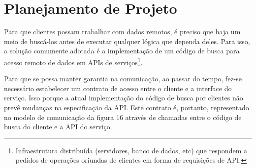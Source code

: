 \section{Planejamento de Projeto}

Para que clientes possam trabalhar com dados remotos, é preciso que haja um meio de buscá-los antes de executar qualquer lógica que dependa deles. Para isso, a solução comumente adotada é a implementação de um código de busca para acesso remoto de dados em APIs de serviços\footnote{
  Infraestrutura distribuída (servidores, banco de dados, etc) que respondem a pedidos de operações oriundas de clientes em forma de requisições de API.
}.

Para que se possa manter garantia na comunicação, ao passar do tempo, fez-se necessário estabelecer um contrato de acesso entre o cliente e a interface do serviço. Isso porque a atual implementação do código de busca por clientes não prevê mudanças na especificação da API. Este contrato é, portanto, representado no modelo de comunicação da figura 16 através de chamadas entre o código de busca do cliente e a API do serviço.

